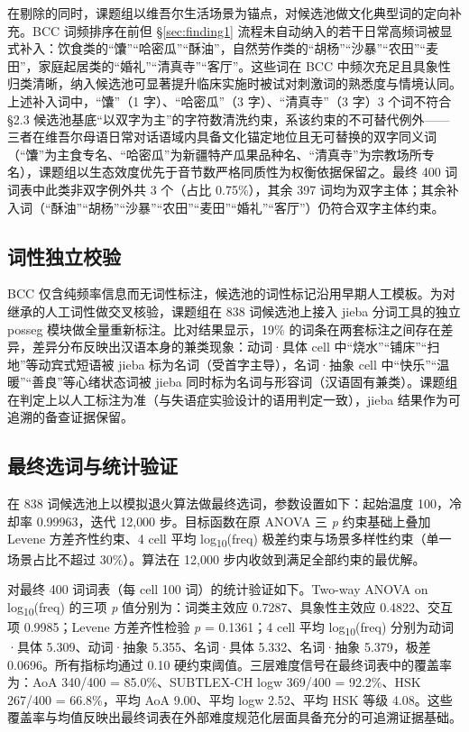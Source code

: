 \documentclass[12pt, a4paper]{article}
\begin{document}
在剔除的同时，课题组以维吾尔生活场景为锚点，对候选池做文化典型词的定向补充。BCC 词频排序在前但 \S\ref{sec:finding1} 流程未自动纳入的若干日常高频词被显式补入：饮食类的“馕”“哈密瓜”“酥油”，自然劳作类的“胡杨”“沙暴”“农田”“麦田”，家庭起居类的“婚礼”“清真寺”“客厅”。这些词在 BCC 中频次充足且具象性归类清晰，纳入候选池可显著提升临床实施时被试对刺激词的熟悉度与情境认同。上述补入词中，“馕”（1 字）、“哈密瓜”（3 字）、“清真寺”（3 字）3 个词不符合 \S 2.3 候选池基底“以双字为主”的字符数清洗约束，系该约束的不可替代例外——三者在维吾尔母语日常对话语域内具备文化锚定地位且无可替换的双字同义词（“馕”为主食专名、“哈密瓜”为新疆特产瓜果品种名、“清真寺”为宗教场所专名），课题组以生态效度优先于音节数严格同质性为权衡依据保留之。最终 400 词词表中此类非双字例外共 3 个（占比 0.75\%），其余 397 词均为双字主体；其余补入词（“酥油”“胡杨”“沙暴”“农田”“麦田”“婚礼”“客厅”）仍符合双字主体约束。

\subsection{词性独立校验}

BCC 仅含纯频率信息而无词性标注，候选池的词性标记沿用早期人工模板。为对继承的人工词性做交叉核验，课题组在 838 词候选池上接入 jieba 分词工具的独立 posseg 模块做全量重新标注。比对结果显示，19\% 的词条在两套标注之间存在差异，差异分布反映出汉语本身的兼类现象：动词·具体 cell 中“烧水”“铺床”“扫地”等动宾式短语被 jieba 标为名词（受首字主导），名词·抽象 cell 中“快乐”“温暖”“善良”等心绪状态词被 jieba 同时标为名词与形容词（汉语固有兼类）。课题组在判定上以人工标注为准（与失语症实验设计的语用判定一致），jieba 结果作为可追溯的备查证据保留。

\subsection{最终选词与统计验证}

在 838 词候选池上以模拟退火算法做最终选词，参数设置如下：起始温度 100，冷却率 0.99963，迭代 12{,}000 步。目标函数在原 ANOVA 三 \textit{p} 约束基础上叠加 Levene 方差齐性约束、4 cell 平均 log\textsubscript{10}(freq) 极差约束与场景多样性约束（单一场景占比不超过 30\%）。算法在 12{,}000 步内收敛到满足全部约束的最优解。

对最终 400 词词表（每 cell 100 词）的统计验证如下。Two-way ANOVA on log\textsubscript{10}(freq) 的三项 \textit{p} 值分别为：词类主效应 0.7287、具象性主效应 0.4822、交互项 0.9985；Levene 方差齐性检验 \textit{p} = 0.1361；4 cell 平均 log\textsubscript{10}(freq) 分别为动词·具体 5.309、动词·抽象 5.355、名词·具体 5.332、名词·抽象 5.379，极差 0.0696。所有指标均通过 0.10 硬约束阈值。三层难度信号在最终词表中的覆盖率为：AoA 340/400 = 85.0\%、SUBTLEX-CH logw 369/400 = 92.2\%、HSK 267/400 = 66.8\%，平均 AoA 9.00、平均 logw 2.52、平均 HSK 等级 4.08。这些覆盖率与均值反映出最终词表在外部难度规范化层面具备充分的可追溯证据基础。
\end{document}
